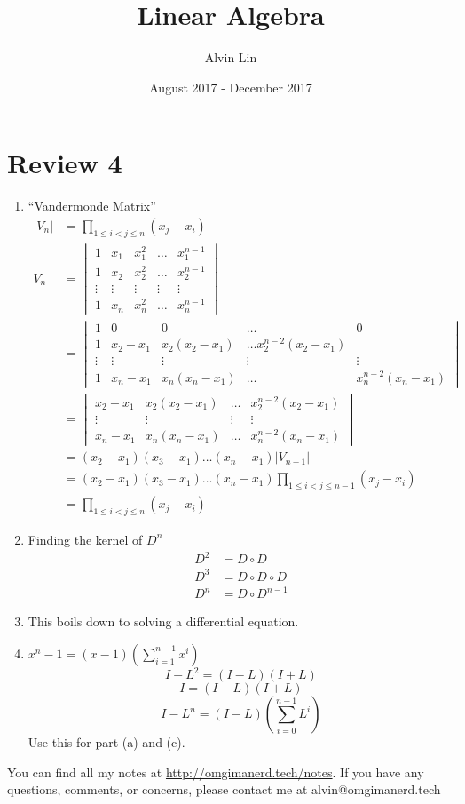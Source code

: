 \documentclass{math}
\title{Linear Algebra}
\author{Alvin Lin}
\date{August 2017 - December 2017}
\begin{document}
\maketitle

\section*{Review 4}
\begin{enumerate}
  \item ``Vandermonde Matrix''
  \begin{align*}
    |V_n| &= \prod_{1\le i<j\le n}(x_j-x_i) \\
    V_n &= \begin{vmatrix}
      1 & x_1 & x_1^2 & \dots & x_1^{n-1} \\
      1 & x_2 & x_2^2 & \dots & x_2^{n-1} \\
      \vdots & \vdots & \vdots & \vdots & \vdots \\
      1 & x_n & x_n^2 & \dots & x_n^{n-1}
    \end{vmatrix} \\
    &= \begin{vmatrix}
      1 & 0 & 0 & \dots & 0 \\
      1 & x_2-x_1 & x_2(x_2-x_1) & \dots x_2^{n-2}(x_2-x_1) \\
      \vdots & \vdots & \vdots & \vdots & \vdots \\
      1 & x_n-x_1 & x_n(x_n-x_1) & \dots & x_n^{n-2}(x_n-x_1)
    \end{vmatrix} \\
    &= \begin{vmatrix}
      x_2-x_1 & x_2(x_2-x_1) & \dots & x_2^{n-2}(x_2-x_1) \\
      \vdots & \vdots & \vdots & \vdots \\
      x_n-x_1 & x_n(x_n-x_1) & \dots & x_n^{n-2}(x_n-x_1)
    \end{vmatrix} \\
    &= (x_2-x_1)(x_3-x_1)\dots(x_n-x_1)|V_{n-1}| \\
    &= (x_2-x_1)(x_3-x_1)\dots(x_n-x_1)\prod_{1\le i<j\le n-1}(x_j-x_i) \\
    &= \prod_{1\le i<j\le n}(x_j-x_i)
  \end{align*}
  \item Finding the kernel of \( D^n \)
  \begin{align*}
    D^2 &= D\circ D \\
    D^3 &= D\circ D\circ D \\
    D^n &= D\circ D^{n-1}
  \end{align*}
  \item This boils down to solving a differential equation.
  \item \( x^n-1 = (x-1)(\sum_{i=1}^{n-1}x^i) \)
  \[ I-L^2 = (I-L)(I+L) \]
  \[ I = (I-L)(I+L) \]
  \[ I-L^n = (I-L)\left(\sum_{i=0}^{n-1}L^i\right) \]
  Use this for part (a) and (c).
\end{enumerate}

\begin{center}
  You can find all my notes at \url{http://omgimanerd.tech/notes}. If you have
  any questions, comments, or concerns, please contact me at
  alvin@omgimanerd.tech
\end{center}
\end{document}
